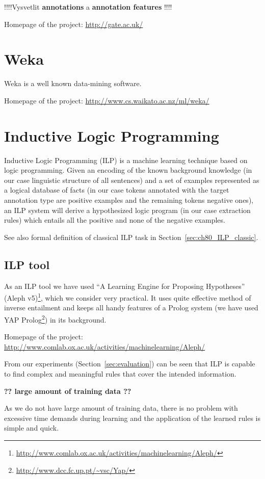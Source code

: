 !!!!Vysvetlit \textbf{annotations} a \textbf{annotation features} !!!!

Homepage of the project: \url{http://gate.ac.uk/}


\section{Weka}

Weka \citep{biblio:Weka} is a well known data-mining software.

Homepage of the project: \url{http://www.cs.waikato.ac.nz/ml/weka/}


\section{Inductive Logic Programming}
Inductive Logic Programming (ILP) \citep{biblio:MuggletonILP} is a machine learning technique based on logic programming. Given an encoding of the known background knowledge (in our case linguistic structure of all sentences) and a set of examples represented as a logical database of facts (in our case tokens annotated with the target annotation type are positive examples and the remaining tokens negative ones), an ILP system will derive a hypothesized logic program (in our case extraction rules) which entails all the positive and none of the negative examples.

See also formal definition of classical ILP task in Section~\ref{sec:ch80_ILP_classic}.

\subsection{ILP tool}
As an ILP tool we have used ``A Learning Engine for Proposing Hypotheses'' (Aleph v5)\footnote{\url{http://www.comlab.ox.ac.uk/activities/machinelearning/Aleph/}}, which we consider very practical. It uses quite effective method of inverse entailment \citep{biblio:InverseEntailment} and keeps all handy features of a Prolog system (we have used YAP Prolog\footnote{\url{http://www.dcc.fc.up.pt/~vsc/Yap/}}) in its background.

Homepage of the project: \url{http://www.comlab.ox.ac.uk/activities/machinelearning/Aleph/}



From our experiments (Section~\ref{sec:evaluation}) can be seen that ILP is capable to find complex and meaningful rules that cover the intended information.



\textbf{?? large amount of training data ??}

As we do not have large amount of training data, there is no problem with excessive time demands during learning and the application of the learned rules is simple and quick.



